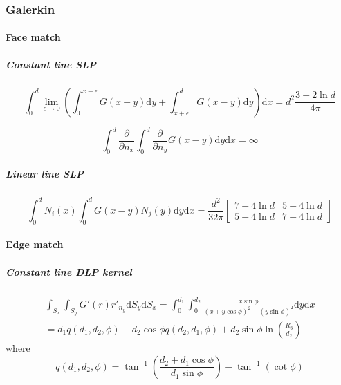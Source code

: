 \documentclass[a4paper,11pt]{article}
\newcommand{\td}{\mathrm{d}}
\begin{document}
\subsubsection{Galerkin}

\paragraph{Face match}

\subparagraph{Constant line SLP}

\begin{equation}
\int_{0}^{d}
\lim_{\epsilon \to 0}
\left(
\int_{0}^{x-\epsilon} G(x-y) \td y
+
\int_{x+\epsilon}^{d} G(x-y) \td y
\right)
\td x
=
d^2\frac{3-2\ln d}{4\pi}
\end{equation}

\begin{equation}
\int_{0}^{d} \frac{\partial}{\partial n_x} \int_{0}^{d} \frac{\partial}{\partial n_y} G(x-y) \td y \td x
=
\infty
\end{equation}

\subparagraph{Linear line SLP}

\begin{equation}
\int_{0}^{d} N_i(x) \int_{0}^{d} G(x-y) N_j(y) \td y \td x
=
\frac{d^2}{32\pi} \begin{bmatrix}
7-4 \ln d & 5 - 4 \ln d \\
5-4 \ln d & 7 - 4 \ln d
\end{bmatrix}
\end{equation}

\paragraph{Edge match}

\subparagraph{Constant line DLP kernel}

\begin{multline}
\int_{S_{x}}
\int_{S_{y}}
G'(r) r'_{n_{y}}
\td S_y
\td S_x =
\int_{0}^{d_1}
\int_{0}^{d_2}
\frac{x\sin\phi}{(x+y \cos\phi)^2 + (y\sin\phi)^2}
\td y
\td x \\
=
d_1 q(d_1, d_2, \phi) - d_2 \cos\phi q(d_2, d_1, \phi)
+ d_2 \sin\phi \ln\left(\frac{R_3}{d_2}\right)
\end{multline}
%
where
%
\begin{equation}
q(d_1, d_2, \phi) = \tan^{-1}\left(\frac{d_2 + d_1 \cos\phi}{d_1 \sin\phi}\right) - \tan^{-1}\left(\cot\phi\right)
\end{equation}
\end{document}
